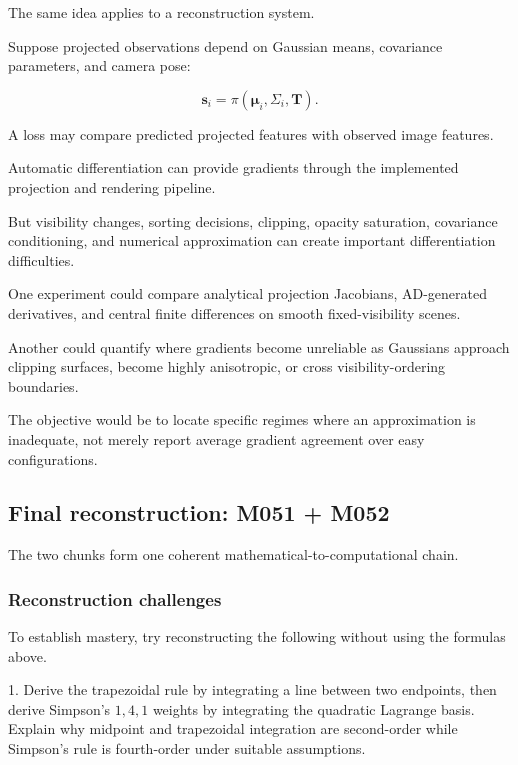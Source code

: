 The same idea applies to a reconstruction system.

Suppose projected observations depend on Gaussian means, covariance parameters, and camera pose:

\[
\mathbf s_i= \pi(\boldsymbol\mu_i,\Sigma_i,\mathbf T).
\]

A loss may compare predicted projected features with observed image features.

Automatic differentiation can provide gradients through the implemented projection and rendering pipeline.

But visibility changes, sorting decisions, clipping, opacity saturation, covariance conditioning, and numerical approximation can create important differentiation difficulties.

One experiment could compare analytical projection Jacobians, AD-generated derivatives, and central finite differences on smooth fixed-visibility scenes.

Another could quantify where gradients become unreliable as Gaussians approach clipping surfaces, become highly anisotropic, or cross visibility-ordering boundaries.

The objective would be to locate specific regimes where an approximation is inadequate, not merely report average gradient agreement over easy configurations.

\subsection{Final reconstruction: M051 + M052}\label{02-foundations-ii-ch022-final-reconstruction-m051-m052}

\hypertarget{02-foundations-ii-ch022-final-reconstruction-m051-m052}{}

The two chunks form one coherent mathematical-to-computational chain.

\subsubsection{Reconstruction challenges}\label{02-foundations-ii-ch022-reconstruction-challenges}

\hypertarget{02-foundations-ii-ch022-reconstruction-challenges}{}

To establish mastery, try reconstructing the following without using the formulas above.

1. Derive the trapezoidal rule by integrating a line between two endpoints, then derive Simpson's \(1,4,1\) weights by integrating the quadratic Lagrange basis. Explain why midpoint and trapezoidal integration are second-order while Simpson's rule is fourth-order under suitable assumptions.

